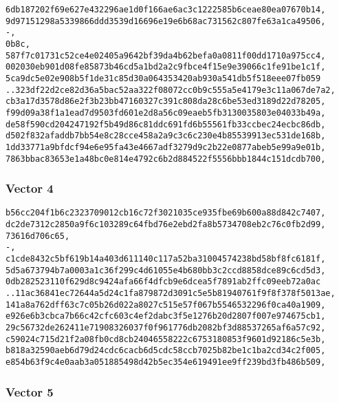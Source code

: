 \documentclass[
]{article}
\begin{document}
\begin{verbatim}
6db187202f69e627e432296ae1d0f166ae6ac3c1222585b6ceae80ea07670b14,
9d97151298a5339866ddd3539d16696e19e6b68ac731562c807fe63a1ca49506,
-,
0b8c,
587f7c01731c52ce4e02405a9642bf39da4b62befa0a0811f00dd1710a975cc4,
002030eb901d08fe85873b46cd5a1bd2a2c9fbce4f15e9e39066c1fe91be1c1f,
5ca9dc5e02e908b5f1de31c85d30a064353420ab930a541db5f518eee07fb059
..323df22d2ce82d36a5bac52aa322f08072cc0b9c555a5e4179e3c11a067de7a2,
cb3a17d3578d86e2f3b23bb47160327c391c808da28c6be53ed3189d22d78205,
f99d09a38f1a1ead7d9503fd601e2d8a56c09eaeb5fb3130035803e04033b49a,
de58f590cd204247192f5b49d86c81ddc691fd6b55561fb33ccbec24ecbc86db,
d502f832afaddb7bb54e8c28cce458a2a9c3c6c230e4b85539913ec531de168b,
1dd33771a9bfdcf94e6e95fa43e4667adf3279d9c2b22e0877abeb5e99a9e01b,
7863bbac83653e1a48bc0e814e4792c6b2d884522f5556bbb1844c151dcdb700,
\end{verbatim}

\hypertarget{vector-4-1}{%
\subsubsection{Vector 4}\label{vector-4-1}}

\begin{verbatim}
b56cc204f1b6c2323709012cb16c72f3021035ce935fbe69b600a88d842c7407,
dc2de7312c2850a9f6c103289c64fbd76e2ebd2fa8b5734708eb2c76c0fb2d99,
73616d706c65,
-,
c1cde8432c5bf619b14a403d611140c117a52ba31004574238bd58bf8fc6181f,
5d5a673794b7a0003a1c36f299c4d61055e4b680bb3c2ccd8858dce89c6cd5d3,
0db282523110f629d8c9424afa66f4dfcb9e6dcea5f7891ab2ffc09eeb72a0ac
..11ac36841ec72644a5d24c1fa879872d3091c5e5b81940761f9f8f378f5013ae,
141a8a762dff63c7c05b26d022a8027c515e57f067b5546532296f0ca40a1909,
e926e6b3cbca7b66c42cfc603c4ef2dabc3f5e1276b20d2807f007e974675cb1,
29c56732de262411e71908326037f0f961776db2082bf3d88537265af6a57c92,
c59024c715d21f2a08fb0cd8cb24046558222c6753180853f9601d92186c5e3b,
b818a32590aeb6d79d24cdc6cacb6d5cdc58ccb7025b82be1c1ba2cd34c2f005,
e854b63f9c4e0aab3a051885498d42b5ec354e619491ee9ff239bd3fb486b509,
\end{verbatim}

\hypertarget{vector-5-1}{%
\subsubsection{Vector 5}\label{vector-5-1}}
\end{document}
